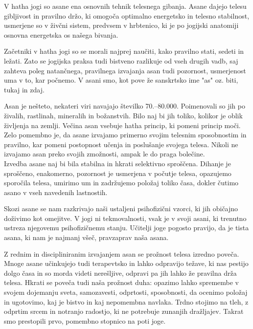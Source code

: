 \documentclass[a4paper, 12pt]{book}
\begin{document}
V hatha jogi so asane ena osnovnih tehnik telesnega gibanja. Asane dajejo telesu gibljivost in pravilno držo, ki omogoča optimalno energetsko in telesno stabilnost, usmerjene so v živčni sistem, predvsem v hrbtenico, ki je po jogijski anatomiji osnovna energetska os našega bivanja.

Začetniki v hatha jogi so se morali najprej naučiti, kako pravilno stati, sedeti in ležati. Zato se jogijska praksa tudi bistveno razlikuje od vseh drugih vadb, saj zahteva poleg natančnega, pravilnega izvajanja asan tudi pozornost, usmerjenost uma v to, kar počnemo. V asani smo, kot pove že sanskrtsko ime "as" oz. biti, tukaj in zdaj.

Asan je nešteto, nekateri viri navajajo številko 70.–80.000. Poimenovali so jih po živalih, rastlinah, mineralih in  božanstvih. Bilo naj bi jih toliko, kolikor je oblik življenja na zemlji. Večina asan vsebuje hatha princip, ki pomeni princip moči. Zelo pomembno je, da asane izvajamo primerno svojim telesnim sposobnostim in pravilno, kar pomeni postopnost učenja in poslušanje svojega telesa. Nikoli ne izvajamo asan preko svojih zmožnosti, ampak le do praga bolečine. \\ 

Izvedba asane naj bi bila stabilna in hkrati selektivno sproščena. Dihanje je sproščeno, enakomerno, pozornost je usmerjena v počutje telesa, opazujemo sporočila telesa, umirimo um in zadržujemo položaj toliko časa, dokler čutimo asano v vseh navedenih lastnostih. 

Skozi asane se nam razkrivajo naši ustaljeni psihofizični vzorci, ki jih običajno doživimo kot omejitve. V jogi ni tekmovalnosti, vsak je v svoji asani, ki trenutno ustreza njegovemu psihofizičnemu stanju. Učitelji joge pogosto pravijo, da je tista asana, ki nam je najmanj všeč, pravzaprav naša asana.

Z rednim in discipliniranim izvajanjem asan se prožnost telesa izredno poveča. Mnoge asane učinkujejo tudi terapevtsko in lahko odpravijo težave, ki nas pestijo dolgo časa in so morda videti nerešljive, odpravi pa jih lahko že pravilna drža telesa. Hkrati se poveča tudi naša prožnost duha: opazimo lahko spremembe v svojem dojemanju sveta, samozavesti, odprtosti, sposobnosti, da ocenimo položaj in ugotovimo, kaj je bistvo in kaj nepomembna navlaka. Trdno stojimo na tleh, z odprtim srcem in notranjo radostjo, ki ne potrebuje zunanjih dražljajev. Takrat smo prestopili prvo, pomembno stopnico na poti joge. \\
\end{document}
